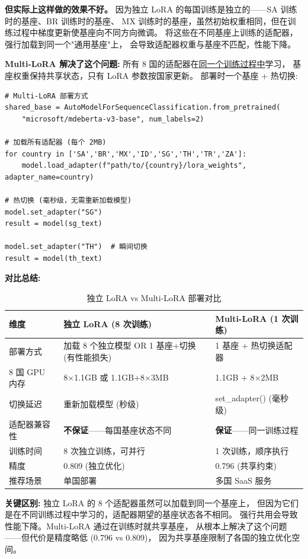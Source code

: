 \documentclass[11pt,a4paper]{article}
\begin{document}
\textbf{但实际上这样做的效果不好。}
因为独立 LoRA 的每国训练是独立的——SA 训练时的基座、BR 训练时的基座、
MX 训练时的基座，虽然初始权重相同，但在训练过程中梯度更新使基座向不同方向微调。
将这些在不同基座上训练的适配器，强行加载到同一个"通用基座"上，
会导致适配器权重与基座不匹配，性能下降。

\textbf{Multi-LoRA 解决了这个问题:} 所有 8 国的适配器在\underline{同一个训练过程中}学习，
基座权重保持共享状态，只有 LoRA 参数按国家更新。
部署时一个基座 + 热切换:

\begin{verbatim}
# Multi-LoRA 部署方式
shared_base = AutoModelForSequenceClassification.from_pretrained(
    "microsoft/mdeberta-v3-base", num_labels=2)

# 加载所有适配器 (每个 2MB)
for country in ['SA','BR','MX','ID','SG','TH','TR','ZA']:
    model.load_adapter(f"path/to/{country}/lora_weights", adapter_name=country)

# 热切换 (毫秒级，无需重新加载模型)
model.set_adapter("SG")
result = model(sg_text)

model.set_adapter("TH")  # 瞬间切换
result = model(th_text)
\end{verbatim}

\textbf{对比总结:}

\begin{table}[h]\centering
\caption{独立 LoRA vs Multi-LoRA 部署对比}
\begin{tabular}{@{}lp{4.5cm}p{4.5cm}@{}}\toprule
\textbf{维度} & \textbf{独立 LoRA (8 次训练)} & \textbf{Multi-LoRA (1 次训练)} \\\midrule
部署方式 & 加载 8 个独立模型 OR 1 基座+切换(有性能损失) & 1 基座 + 热切换适配器 \\
8 国 GPU 内存 & 8$\times$1.1GB 或 1.1GB+8$\times$3MB & 1.1GB + 8$\times$2MB \\
切换延迟 & 重新加载模型 (秒级) & set\_adapter() (毫秒级) \\
适配器兼容性 & \textbf{不保证}——每国基座状态不同 & \textbf{保证}——同一训练过程 \\
训练时间 & 8 次独立训练，可并行 & 1 次训练，顺序执行 \\
精度 & 0.809 (独立优化) & 0.796 (共享约束) \\
推荐场景 & 单国部署 & 多国 SaaS 服务 \\
\bottomrule
\end{tabular}
\end{table}

\textbf{关键区别:}
独立 LoRA 的 8 个适配器虽然可以加载到同一个基座上，
但因为它们是在不同训练过程中学习的，适配器期望的基座状态各不相同。
强行共用会导致性能下降。Multi-LoRA 通过在训练时就共享基座，
从根本上解决了这个问题——但代价是精度略低 (0.796 vs 0.809)，
因为共享基座限制了各国的独立优化空间。
\end{document}
